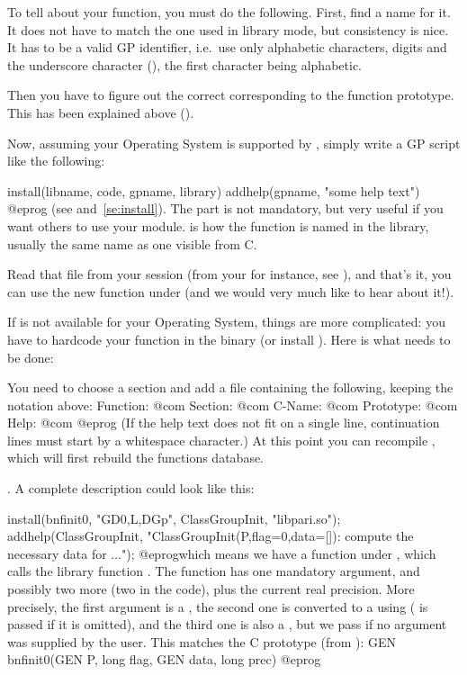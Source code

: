 To tell  about your function, you must do the following. First, find a
name for it. It does not have to match the one used in library mode, but
consistency is nice. It has to be a valid GP identifier, i.e.~use only
alphabetic characters, digits and the underscore character (\kbd{\_}), the
first character being alphabetic.

Then you have to figure out the correct  corresponding to
the function prototype. This has been explained above
().

Now, assuming your Operating System is supported by , simply
write a GP script like the following:

\bprog
install(libname, code, gpname, library)
addhelp(gpname, "some help text")
@eprog
\noindent(see  and~\ref{se:install}). The 
part is not mandatory, but very useful if you want others to use your
module.  is how the function is named in the library,
usually the same name as one visible from C.

Read that file from your  session (from your  for
instance, see ), and that's it, you can use the new
function  under  (and we would very much like to hear about
it!).


If  is not available for your Operating System, things are more
complicated: you have to hardcode your function in the  binary (or
install ). Here is what needs to be done:

You need to choose a section and add a file
containing the following, keeping the notation above:
\bprog
Function:  @com
Section:   @com
C-Name:    @com
Prototype: @com
Help:      @com
@eprog\noindent
(If the help text does not fit on a single line, continuation lines must
start by a whitespace character.) At this point you can recompile ,
which will first rebuild the functions database.

.
%
A complete description could look like this:

\bprog
{
  install(bnfinit0, "GD0,L,DGp", ClassGroupInit, "libpari.so");
  addhelp(ClassGroupInit, "ClassGroupInit(P,{flag=0},{data=[]}):
    compute the necessary data for ...");
}
@eprog\noindent which means we have a function  under
, which calls the library function  . The function has
one mandatory argument, and possibly two more (two  in the code),
plus the current real precision. More precisely, the first argument is a
, the second one is converted to a  using 
( is passed if it is omitted), and the third one is also a ,
but we pass  if no argument was supplied by the user. This matches
the C prototype (from ):
%
\bprog
  GEN bnfinit0(GEN P, long flag, GEN data, long prec)
@eprog

